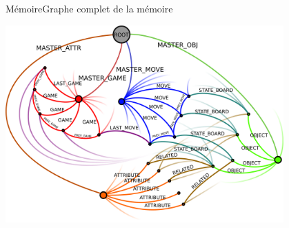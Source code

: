 \begin{frame}{Mémoire}{Graphe complet de la mémoire}
\begin{center}
\includegraphics[width=0.8\textwidth]{img/neo4j/full_graph}
\end{center}
\end{frame}
